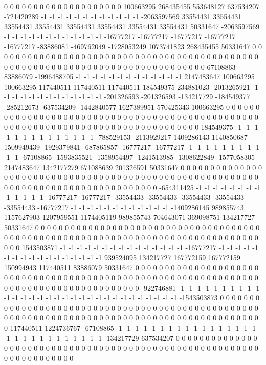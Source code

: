 0 0 0 0 0 0 0 0 0 0 0 0 0 0 0 0 0 0 0 0 100663295 268435455 553648127 637534207 -721420289 -1 -1 -1 -1 -1 -1 -1 -1 -1 -1 -1 -1 -2063597569 33554431 33554431 33554431 33554431 33554431 33554431 33554431 33554431 50331647 -2063597569 -1 -1 -1 -1 -1 -1 -1 -1 -1 -1 -1 -1 -16777217 -16777217 -16777217 -16777217 -16777217 -83886081 -469762049 -1728053249 1073741823 268435455 50331647 0 0 0 0 0 0 0 0 0 0 0 0 0 0 0 0 0 0 0 0 0 0 0 0 0 0 0 0 0 0 0 0 0 0 0 0 0 0 0 0 0 0 0 0 0 0 0 0 0 0 0 0 0 0 0 0 0
0 0 0 0 0 0 0 0 0 0 0 0 0 0 0 0 0 0 0 0 0 0 67108863 83886079 -1996488705 -1 -1 -1 -1 -1 -1 -1 -1 -1 -1 -1 -1 -1 2147483647 100663295 100663295 117440511 117440511 117440511 184549375 234881023 -2013265921 -1 -1 -1 -1 -1 -1 -1 -1 -1 -1 -1 -1 -1 -201326593 -201326593 -134217729 -184549377 -285212673 -637534209 -1442840577 1627389951 570425343 100663295 0 0 0 0 0 0 0 0 0 0 0 0 0 0 0 0 0 0 0 0 0 0 0 0 0 0 0 0 0 0 0 0 0 0 0 0 0 0 0 0 0 0 0 0 0 0 0 0 0 0 0 0 0 0 0 0 0 0
0 0 0 0 0 0 0 0 0 0 0 0 0 0 0 0 0 0 0 0 0 0 0 0 184549375 -1 -1 -1 -1 -1 -1 -1 -1 -1 -1 -1 -1 -1 -1 -788529153 -2113929217 1409286143 1140850687 1509949439 -1929379841 -687865857 -16777217 -16777217 -1 -1 -1 -1 -1 -1 -1 -1 -1 -1 -1 -67108865 -1593835521 -1358954497 -1241513985 -1308622849 -1577058305 2147483647 1342177279 671088639 201326591 50331647 0 0 0 0 0 0 0 0 0 0 0 0 0 0 0 0 0 0 0 0 0 0 0 0 0 0 0 0 0 0 0 0 0 0 0 0 0 0 0 0 0 0 0 0 0 0 0 0 0 0 0 0 0 0 0 0 0 0
0 0 0 0 0 0 0 0 0 0 0 0 0 0 0 0 0 0 0 0 0 0 0 0 0 -654311425 -1 -1 -1 -1 -1 -1 -1 -1 -1 -1 -1 -1 -1 -16777217 -16777217 -33554433 -33554433 -33554433 -33554433 -33554433 -16777217 -1 -1 -1 -1 -1 -1 -1 -1 -1 -1 -1 -1 -1409286145 989855743 1157627903 1207959551 1174405119 989855743 704643071 369098751 134217727 50331647 0 0 0 0 0 0 0 0 0 0 0 0 0 0 0 0 0 0 0 0 0 0 0 0 0 0 0 0 0 0 0 0 0 0 0 0 0 0 0 0 0 0 0 0 0 0 0 0 0 0 0 0 0 0 0 0 0 0 0
0 0 0 0 0 0 0 0 0 0 0 0 0 0 0 0 0 0 0 0 0 0 0 0 0 1543503871 -1 -1 -1 -1 -1 -1 -1 -1 -1 -1 -1 -1 -1 -1 -1 -16777217 -1 -1 -1 -1 -1 -1 -1 -1 -1 -1 -1 -1 -1 -1 -1 -1 -1 939524095 134217727 167772159 167772159 150994943 117440511 83886079 50331647 0 0 0 0 0 0 0 0 0 0 0 0 0 0 0 0 0 0 0 0 0 0 0 0 0 0 0 0 0 0 0 0 0 0 0 0 0 0 0 0 0 0 0 0 0 0 0 0 0 0 0 0 0 0 0 0 0 0 0 0 0
0 0 0 0 0 0 0 0 0 0 0 0 0 0 0 0 0 0 0 0 0 0 0 0 0 0 -922746881 -1 -1 -1 -1 -1 -1 -1 -1 -1 -1 -1 -1 -1 -1 -1 -1 -1 -1 -1 -1 -1 -1 -1 -1 -1 -1 -1 -1 -1 -1 -1 -1543503873 0 0 0 0 0 0 0 0 0 0 0 0 0 0 0 0 0 0 0 0 0 0 0 0 0 0 0 0 0 0 0 0 0 0 0 0 0 0 0 0 0 0 0 0 0 0 0 0 0 0 0 0 0 0 0 0 0 0 0 0 0 0 0 0 0 0 0 0 0
0 0 0 0 0 0 0 0 0 0 0 0 0 0 0 0 0 0 0 0 0 0 0 0 0 117440511 1224736767 -67108865 -1 -1 -1 -1 -1 -1 -1 -1 -1 -1 -1 -1 -1 -1 -1 -1 -1 -1 -1 -1 -1 -1 -1 -1 -1 -1 -1 -1 -1 -134217729 637534207 0 0 0 0 0 0 0 0 0 0 0 0 0 0 0 0 0 0 0 0 0 0 0 0 0 0 0 0 0 0 0 0 0 0 0 0 0 0 0 0 0 0 0 0 0 0 0 0 0 0 0 0 0 0 0 0 0 0 0 0 0 0 0 0 0 0 0 0 0
